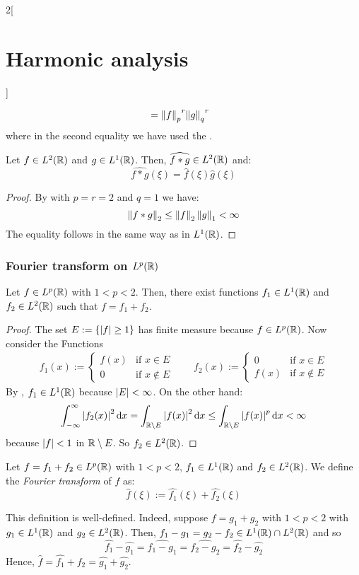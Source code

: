 \documentclass[../../../main_math.tex]{subfiles}
\begin{document}
\begin{multicols}{2}[\section{Harmonic analysis}]
\begin{sproof}
\begin{align*}
                       & ={\left\|f\right\|_p}^{r}{\left\|g\right\|_q}^{r}
    \end{align*}
    where in the second equality we have used the .
  \end{sproof}
  \begin{theorem}
    Let $f\in L^2(\mathbb{R})$ and $g\in L^1(\mathbb{R})$. Then, $\widehat{f*g}\in L^2(\mathbb{R})$ and:$$\widehat{f*g}(\xi)=\widehat{f}(\xi)\widehat{g}(\xi)$$
  \end{theorem}
  \begin{proof}
    By  with $p=r=2$ and $q=1$ we have:
    $$\left\|f*g\right\|_2\leq\left\|f\right\|_2\left\|g\right\|_1<\infty$$
    The equality follows in the same way as in $L^1(\mathbb{R})$.
  \end{proof}
  \subsubsection{Fourier transform on \texorpdfstring{$L^p(\mathbb{R})$}{Lp(R)}}
  \begin{lemma}
    Let $f\in L^p(\mathbb{R})$ with $1<p<2$. Then, there exist functions $f_1\in L^1(\mathbb{R})$ and $f_2\in L^2(\mathbb{R})$ such that $f=f_1+f_2$.
  \end{lemma}
  \begin{proof}
    The set $E:=\{\abs{f}\geq 1\}$ has finite measure because $f\in L^p(\mathbb{R})$. Now consider the Functions
    \begin{gather*}
      f_1(x):=\begin{cases}
        f(x) & \text{if }x\in E    \\
        0    & \text{if }x\notin E
      \end{cases}\qquad
      f_2(x):=\begin{cases}
        0    & \text{if }x\in E    \\
        f(x) & \text{if }x\notin E
      \end{cases}
    \end{gather*}
    By , $f_1\in L^1(\mathbb{R})$ because $\m{E}<\infty$. On the other hand: $$\int_{-\infty}^{\infty}\abs{f_2(x)}^2\dd{x}=\int_{\mathbb{R}\setminus E}\abs{f(x)}^2\dd{x}\leq \int_{\mathbb{R}\setminus E}\abs{f(x)}^p\dd{x}<\infty$$
    because $\abs{f}<1$ in $\mathbb{R}\setminus E$.
    So $f_2\in L^2(\mathbb{R})$.
  \end{proof}
  \begin{definition}
    Let $f=f_1+f_2\in L^p(\mathbb{R})$ with $1<p<2$, $f_1\in L^1(\mathbb{R})$ and $f_2\in L^2(\mathbb{R})$. We define the \emph{Fourier transform} of $f$ as:
    $$\widehat{f}(\xi):=\widehat{f_1}(\xi)+\widehat{f_2}(\xi)$$
  \end{definition}
  \begin{remark}
    This definition is well-defined. Indeed, suppose $f=g_1+g_2$ with $1<p<2$ with $g_1\in L^1(\mathbb{R})$ and $g_2\in L^2(\mathbb{R})$. Then, $f_1-g_1=g_2-f_2\in L^1(\mathbb{R})\cap L^2(\mathbb{R})$ and so $$\widehat{f_1}-\widehat{g_1}=\widehat{f_1-g_1}=\widehat{f_2-g_2}=\widehat{f_2}-\widehat{g_2}$$
    Hence, $\widehat{f}=\widehat{f_1}+\widehat{f_2}=\widehat{g_1}+\widehat{g_2}$.
  \end{remark}

\end{multicols}
\end{document}

